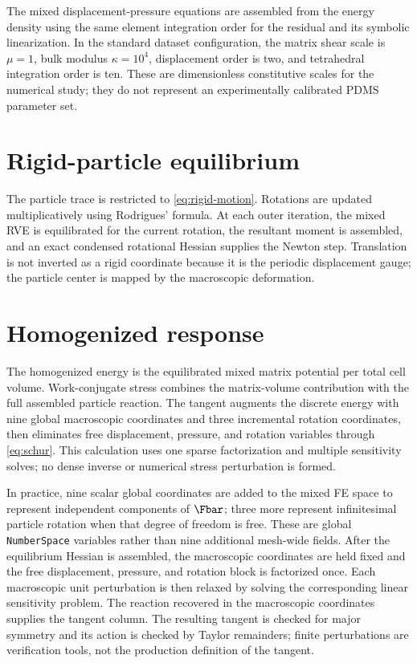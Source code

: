 The mixed displacement-pressure equations are assembled from the energy
density using the same element integration order for the residual and its
symbolic linearization. In the standard dataset configuration, the matrix
shear scale is \(\mu=1\), bulk modulus \(\kappa=10^4\), displacement order is
two, and tetrahedral integration order is ten. These are dimensionless
constitutive scales for the numerical study; they do not represent an
experimentally calibrated PDMS parameter set.

\section{Rigid-particle equilibrium}

The particle trace is restricted to \cref{eq:rigid-motion}. Rotations are
updated multiplicatively using Rodrigues' formula. At each outer iteration,
the mixed RVE is equilibrated for the current rotation, the resultant moment
is assembled, and an exact condensed rotational Hessian supplies the Newton
step. Translation is not inverted as a rigid coordinate because it is the
periodic displacement gauge; the particle center is mapped by the
macroscopic deformation.

\section{Homogenized response}

The homogenized energy is the equilibrated mixed matrix potential per total
cell volume. Work-conjugate stress combines the matrix-volume contribution
with the full assembled particle reaction. The tangent augments the discrete
energy with nine global macroscopic coordinates and three incremental
rotation coordinates, then eliminates free displacement, pressure, and
rotation variables through \cref{eq:schur}. This calculation uses one sparse
factorization and multiple sensitivity solves; no dense inverse or numerical
stress perturbation is formed.

In practice, nine scalar global coordinates are added to the mixed FE space
to represent independent components of \(\Fbar\); three more represent
infinitesimal particle rotation when that degree of freedom is free. These
are global \texttt{NumberSpace} variables rather than nine additional
mesh-wide fields. After the equilibrium Hessian is assembled, the
macroscopic coordinates are held fixed and the free displacement, pressure,
and rotation block is factorized once. Each macroscopic unit perturbation is
then relaxed by solving the corresponding linear sensitivity problem. The
reaction recovered in the macroscopic coordinates supplies the tangent
column. The resulting tangent is checked for major symmetry and its action
is checked by Taylor remainders; finite perturbations are verification
tools, not the production definition of the tangent.

